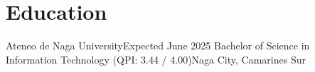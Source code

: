 \section{Education}

\resumeSubHeadingListStart
    \resumeSubheading
    {Ateneo de Naga University}{Expected June 2025}
    {Bachelor of Science in Information Technology (QPI: 3.44 / 4.00)}{Naga City, Camarines Sur}
\resumeSubHeadingListEnd
